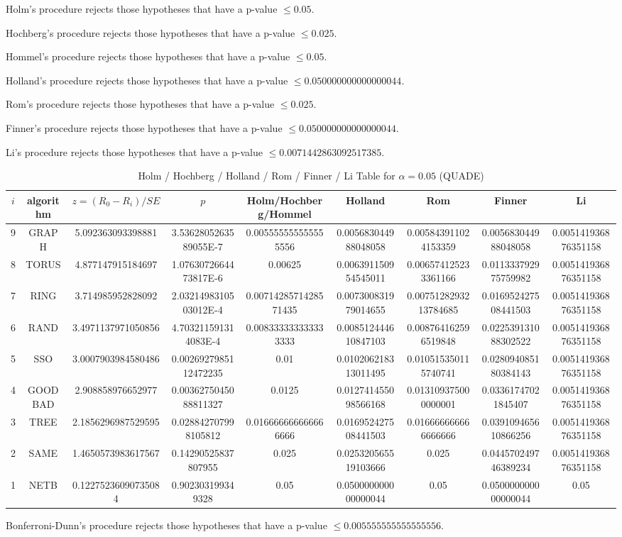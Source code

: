 \documentclass[a4paper,10pt]{article}
\begin{document}
\begin{landscape}
Holm's procedure rejects those hypotheses that have a p-value $\le0.05$.


Hochberg's procedure rejects those hypotheses that have a p-value $\le0.025$.


Hommel's procedure rejects those hypotheses that have a p-value $\le0.05$.


Holland's procedure rejects those hypotheses that have a p-value $\le0.050000000000000044$.


Rom's procedure rejects those hypotheses that have a p-value $\le0.025$.


Finner's procedure rejects those hypotheses that have a p-value $\le0.050000000000000044$.


Li's procedure rejects those hypotheses that have a p-value $\le0.0071442863092517385$.



\newpage

\begin{table}[!htp]
\centering\scriptsize
\caption{Holm / Hochberg / Holland / Rom / Finner / Li Table for $\alpha=0.05$ (QUADE)}
\begin{tabular}{ccccccccc}
$i$&algorithm&$z=(R_0 - R_i)/SE$&$p$&Holm/Hochberg/Hommel&Holland&Rom&Finner&Li\\
\hline
9& GRAPH&5.092363093398881&3.5362805263589055E-7&0.005555555555555556&0.005683044988048058&0.005843911024153359&0.005683044988048058&0.005141936876351158\\
8& TORUS&4.877147915184697&1.0763072664473817E-6&0.00625&0.006391150954545011&0.006574125233361166&0.011333792975759982&0.005141936876351158\\
7& RING&3.714985952828092&2.0321498310503012E-4&0.0071428571428571435&0.007300831979014655&0.0075128293213784685&0.016952427508441503&0.005141936876351158\\
6& RAND&3.4971137971050856&4.703211591314083E-4&0.008333333333333333&0.008512444610847103&0.008764162596519848&0.022539131088302522&0.005141936876351158\\
5& SSO&3.0007903984580486&0.0026927985112472235&0.01&0.010206218313011495&0.010515350115740741&0.028094085180384143&0.005141936876351158\\
4& GOODBAD&2.908858976652977&0.0036275045088811327&0.0125&0.012741455098566168&0.013109375000000001&0.03361747021845407&0.005141936876351158\\
3& TREE&2.1856296987529595&0.028842707998105812&0.016666666666666666&0.016952427508441503&0.016666666666666666&0.039109465610866256&0.005141936876351158\\
2& SAME&1.4650573983617567&0.14290525837807955&0.025&0.025320565519103666&0.025&0.044570249746389234&0.005141936876351158\\
1& NETB&0.12275236090735084&0.902303199349328&0.05&0.050000000000000044&0.05&0.050000000000000044&0.05\\
\hline
\end{tabular}
\end{table}
Bonferroni-Dunn's procedure rejects those hypotheses that have a p-value $\le0.005555555555555556$.



\end{landscape}
\end{document}

